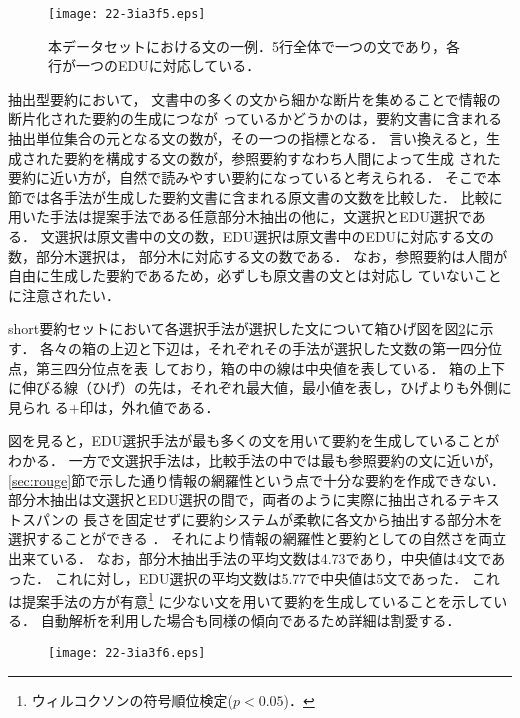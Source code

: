 \documentclass[japanese]{jnlp_1.4}
\begin{document}
\begin{figure}[b]
\begin{center}
\texttt{[image: 22-3ia3f5.eps]}
\end{center}
\caption{本データセットにおける文の一例．5行全体で一つの文であり，各行が一つのEDUに対応している．}
\label{fig:edus}
\end{figure}

抽出型要約において，
文書中の多くの文から細かな断片を集めることで情報の断片化された要約の生成につなが
っているかどうかのは，要約文書に含まれる抽出単位集合の元となる文の数が，その一つの指標となる．
言い換えると，生成された要約を構成する文の数が，参照要約すなわち人間によって生成
された要約に近い方が，自然で読みやすい要約になっていると考えられる．
そこで本節では各手法が生成した要約文書に含まれる原文書の文数を比較した．
比較に用いた手法は提案手法である任意部分木抽出の他に，文選択とEDU選択である．
文選択は原文書中の文の数，EDU選択は原文書中のEDUに対応する文の数，部分木選択は，
部分木に対応する文の数である．
なお，参照要約は人間が自由に生成した要約であるため，必ずしも原文書の文とは対応し
ていないことに注意されたい．

short要約セットにおいて各選択手法が選択した文について箱ひげ図を図\ref{fig:boxes_short}に示す．
各々の箱の上辺と下辺は，それぞれその手法が選択した文数の第一四分位点，第三四分位点を表
しており，箱の中の線は中央値を表している．
箱の上下に伸びる線（ひげ）の先は，それぞれ最大値，最小値を表し，ひげよりも外側に見られ
る$+$印は，外れ値である．

図を見ると，EDU選択手法が最も多くの文を用いて要約を生成していることがわかる．
一方で文選択手法は，比較手法の中では最も参照要約の文に近いが，
\ref{sec:rouge}節で示した通り情報の網羅性という点で十分な要約を作成できない．
部分木抽出は文選択とEDU選択の間で，両者のように実際に抽出されるテキストスパンの
長さを固定せずに要約システムが柔軟に各文から抽出する部分木を選択することができる
．
それにより情報の網羅性と要約としての自然さを両立出来ている．
なお，部分木抽出手法の平均文数は4.73であり，中央値は4文であった．
これに対し，EDU選択の平均文数は5.77で中央値は5文であった．
これは提案手法の方が有意\footnote{ウィルコクソンの符号順位検定($p < 0.05$)．}
に少ない文を用いて要約を生成していることを示している．
自動解析を利用した場合も同様の傾向であるため詳細は割愛する．

\begin{figure}[b]
\begin{center}
\texttt{[image: 22-3ia3f6.eps]}
\end{center}
\label{fig:boxes_short}
\end{figure}
\end{document}
